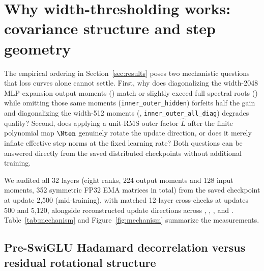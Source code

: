 \section{Why width-thresholding works: covariance structure and step geometry}
\label{sec:mechanism}

The empirical ordering in Section~\ref{sec:results} poses two mechanistic
questions that loss curves alone cannot settle. First, why does diagonalizing
the width-2048 MLP-expansion output moments (\mlpdiag{}) match or slightly
exceed full spectral roots (\dense{}) while omitting those same moments
(\texttt{inner\_outer\_hidden}) forfeits half the gain and diagonalizing the
width-512 moments (\alldiag{}, \texttt{inner\_outer\_all\_diag}) degrades
quality? Second, does applying a unit-RMS outer factor $\hat L$ after the
finite polynomial map $\Nten$ genuinely rotate the update direction, or does it
merely inflate effective step norms at the fixed learning rate? Both questions
can be answered directly from the saved distributed checkpoints without
additional training.

We audited all 32 layers (eight ranks, 224 output moments and 128 input
moments, 352 symmetric FP32 EMA matrices in total) from the saved
\dense{} checkpoint at update 2{,}500 (mid-training), with matched
12-layer cross-checks at updates 500 and 5{,}120, alongside reconstructed
update directions across \muont{}, \mlpdiag{}, \alldiag{}, and \dense{}.
Table~\ref{tab:mechanism} and Figure~\ref{fig:mechanism} summarize the
measurements.

\begin{table}[t]
\centering
\caption{Covariance structure and diagonal preconditioner fidelity across all
32 layers at update 2{,}500 (\dense{} checkpoints, 352 FP32 EMA matrices).
``Diag.\ \%'' is $\|\diag(F)\|_2^2 / \|F\|_F^2$; $\mathrm{CV}(D)$ is the
coefficient of variation of the diagonal entries; $\lambda_{\max}/\bar\lambda$
and $\lambda_{\max}(R)$ are the top-to-mean eigenvalue ratios before and after
diagonal whitening ($R = D^{-1/2}FD^{-1/2}$). Relative errors compare
$L_{\diag}$ and $I$ against the exact spectral inner root $L = A_d(F)^{-1/2}$,
and $R^2(L) = 1 - \|L - L_{\diag}\|_F^2 / \|L - I\|_F^2$ is the fraction of
the preconditioner's departure from identity explained by diagonal scaling
alone.}
\label{tab:mechanism}
\scriptsize\setlength{\tabcolsep}{3.2pt}

\end{table}

\subsection{Pre-SwiGLU Hadamard decorrelation versus residual rotational structure}
\label{sec:mech-hadamard}

